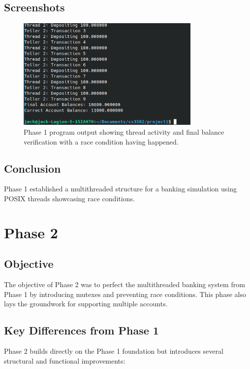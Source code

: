 \documentclass[12pt]{article}
\begin{document}
\subsection{Screenshots}
\begin{figure}[H]
  \centering
  \includegraphics[width=0.8\textwidth]{phase1_race_cond.png}
  \caption{Phase 1 program output showing thread activity and final balance verification with a race condition having happened.}
\end{figure}

\subsection{Conclusion}
Phase 1 established a multithreaded structure for a banking simulation using POSIX threads showcasing race conditions.


\newpage
\section{Phase 2}

\subsection{Objective}
The objective of Phase 2 was to perfect the multithreaded banking system from Phase 1 by introducing mutexes and preventing race conditions.
This phase also lays the groundwork for supporting multiple accounts.

\subsection{Key Differences from Phase 1}

Phase 2 builds directly on the Phase 1 foundation but introduces several structural and functional improvements:
\end{document}

